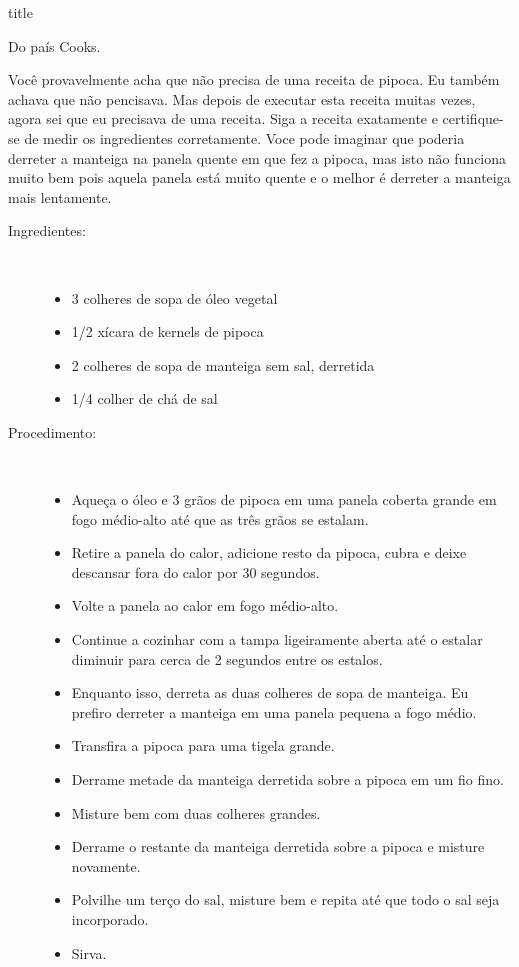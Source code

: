\documentclass [11pt, letterpaper] {article}
\begin{document}
 {title}

\begin {flushright}
{\hspace {4in} Do país Cooks.}
\end {flushright}
\vspace {0.5in}

Você provavelmente acha que n\~ao precisa de uma receita de
pipoca. Eu tamb\'em achava que n\~ao pencisava. Mas depois de executar
esta receita muitas vezes, agora sei que eu precisava de uma receita. Siga a receita exatamente e certifique-se de medir os ingredientes corretamente.
Voce pode imaginar que poderia derreter a manteiga na panela quente em
que fez a pipoca, mas isto n\~ao funciona muito bem pois aquela panela
est\'a muito quente e o melhor \'e derreter a manteiga mais lentamente.

\begin {description}

\item [Ingredientes:] \ \\
\begin {itemize}
\item 3 colheres de sopa de óleo vegetal
\item 1/2 xícara de kernels de pipoca
\item 2 colheres de sopa de manteiga sem sal, derretida
\item 1/4 colher de chá de sal
\end {itemize}

\item [Procedimento:] \ \\

\begin {itemize}
\item Aqueça o óleo e 3 grãos de pipoca em uma panela coberta grande em fogo médio-alto até que as três grãos se estalam.
\item Retire a panela do calor, adicione resto da pipoca, cubra e
deixe descansar fora do calor por 30 segundos.
\item Volte a panela ao calor em fogo médio-alto.
\item Continue a cozinhar com a tampa ligeiramente aberta até o estalar diminuir para cerca de 2 segundos entre os estalos.
\item Enquanto isso, derreta as duas colheres de sopa de manteiga. Eu prefiro derreter a manteiga em uma panela pequena a fogo médio.
\item Transfira a pipoca para uma tigela grande.
\item Derrame metade da manteiga derretida sobre a pipoca em um fio fino.
\item Misture bem com duas colheres grandes.
\item Derrame o restante da manteiga derretida sobre a pipoca e misture novamente.
\item Polvilhe um terço do sal, misture bem e repita até que todo o sal seja incorporado.
\item Sirva.
\end {itemize}
\end {description}
\end{document}

